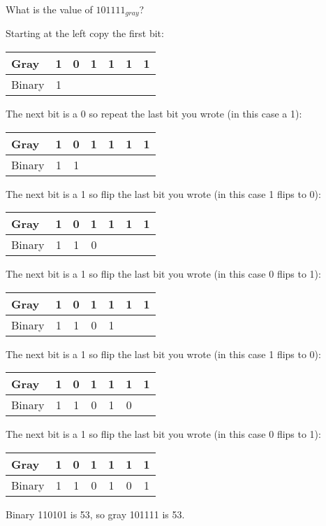 \begin{example}
What is the value of $101111_{gray}$?

{\color{ans}
Starting at the left copy the first bit:

\begin{tabular}{l|cccccc}
Gray   & 1 & 0 & 1 & 1 & 1 & 1 \\ \hline
Binary & 1 &   &   &   &   &   \\
\end{tabular}

The next bit is a 0 so repeat the last bit you wrote (in this case a 1):

\begin{tabular}{l|cccccc}
Gray   & 1 & 0 & 1 & 1 & 1 & 1 \\ \hline
Binary & 1 & 1 &   &   &   &   \\
\end{tabular}

The next bit is a 1 so flip the last bit you wrote (in this case 1 flips to 0):

\begin{tabular}{l|cccccc}
Gray   & 1 & 0 & 1 & 1 & 1 & 1 \\ \hline
Binary & 1 & 1 & 0 &   &   &   \\
\end{tabular}

The next bit is a 1 so flip the last bit you wrote (in this case 0 flips to 1):

\begin{tabular}{l|cccccc}
Gray   & 1 & 0 & 1 & 1 & 1 & 1 \\ \hline
Binary & 1 & 1 & 0 & 1 &   &   \\
\end{tabular}

The next bit is a 1 so flip the last bit you wrote (in this case 1 flips to 0):

\begin{tabular}{l|cccccc}
Gray   & 1 & 0 & 1 & 1 & 1 & 1 \\ \hline
Binary & 1 & 1 & 0 & 1 & 0 &   \\
\end{tabular}

The next bit is a 1 so flip the last bit you wrote (in this case 0 flips to 1):

\begin{tabular}{l|cccccc}
Gray   & 1 & 0 & 1 & 1 & 1 & 1 \\ \hline
Binary & 1 & 1 & 0 & 1 & 0 & 1 \\
\end{tabular}

Binary 110101 is 53, so gray 101111 is 53.
}
\end{example}


